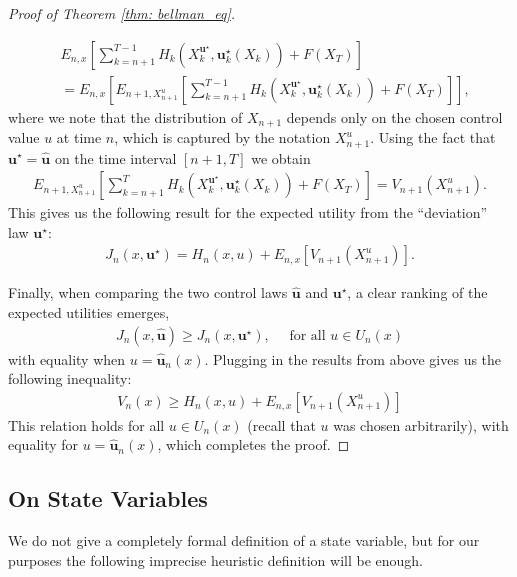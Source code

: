 \documentclass[\topdir/lecture\_notes.tex]{subfiles}
\begin{document}
\begin{optional}
\begin{proof}[Proof of Theorem \ref{thm: bellman_eq}]
\begin{enumerate}
    \begin{equation*}
        \begin{split}
        &E_{n, x}\left[\sum_{k=n+1}^{T-1} H_{k}(X_{k}^{\mathbf{u}^{\star}}, \mathbf{u}_{k}^{\star}(X_{k}))+F(X_{T})\right]  \\
        &= E_{n, x}\left[E_{n+1, X_{n+1}^{u}}\left[\sum_{k=n+1}^{T-1} H_{k}(X_{k}^{\mathbf{u}^{\star}}, \mathbf{u}_{k}^{\star}(X_{k}))+F(X_{T})\right]\right],
        \end{split}
    \end{equation*}
    where we note that the distribution of $X_{n+1}$ depends only on the chosen control value $u$ at time $n$, which is captured by the notation $X_{n+1}^{u}$. Using the fact that $\mathbf{u}^{\star}=\hat{\mathbf{u}}$ on the time interval $[n+1, T]$ we obtain
    \begin{align*}
    E_{n+1, X_{n+1}^{u}}\left[\sum_{k=n+1}^{T} H_{k}(X_{k}^{\mathbf{u}^{\star}}, \mathbf{u}_{k}^{\star}(X_{k}))+F(X_{T})\right]=V_{n+1}(X_{n+1}^{u}).
    \end{align*}
    This gives us the following result for the expected utility from the ``deviation'' law $\mathbf{u}^{\star}$:
    \begin{align*}
    J_{n}(x, \mathbf{u}^{\star})=H_{n}(x, u)+E_{n, x}\left[V_{n+1}(X_{n+1}^{u})\right].
    \end{align*}
\end{enumerate}

Finally, when comparing the two control laws $\hat{\mathbf{u}}$ and $\mathbf{u}^{\star}$, a clear ranking of the expected utilities emerges,
\begin{align*}
J_{n}(x, \hat{\mathbf{u}}) \geq J_{n}(x, \mathbf{u}^{\star}), \quad \text { for all } u \in U_{n}(x)
\end{align*}
with equality when $u=\hat{\mathbf{u}}_{n}(x)$. Plugging in the results from above gives us the following inequality:
\begin{align*}
V_{n}(x) \geq H_{n}(x, u)+E_{n, x}\left[V_{n+1}(X_{n+1}^{u})\right]
\end{align*}
This relation holds for all $u \in U_{n}(x)$ (recall that $u$ was chosen arbitrarily), with equality for $u=\hat{\mathbf{u}}_{n}(x)$, which completes the proof.
\end{proof}
\end{optional}

\subsection{On State Variables}
We do not give a completely formal definition of a state variable, but for our purposes the following imprecise heuristic definition will be enough.
\end{document}
